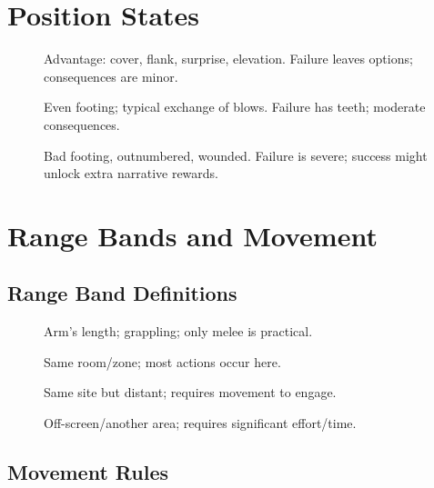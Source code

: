 \section{Position States}
\label{sec:position-states}

\begin{description}
  \item[] Advantage: cover, flank, surprise, elevation. Failure leaves options; consequences are minor. 
  \item[] Even footing; typical exchange of blows. Failure has teeth; moderate consequences. 
  \item[] Bad footing, outnumbered, wounded. Failure is severe; success might unlock extra narrative rewards. 
\end{description}

\section{Range Bands and Movement}
\label{sec:range-bands}

\subsection{Range Band Definitions}
\label{subsec:range-definitions}

\begin{description}
  \item[] Arm’s length; grappling; only melee is practical. 
  \item[] Same room/zone; most actions occur here. 
  \item[] Same site but distant; requires movement to engage. 
  \item[] Off-screen/another area; requires significant effort/time. 
\end{description}

\subsection{Movement Rules}
\label{subsec:movement-rules}

